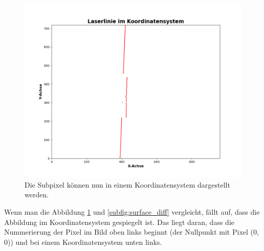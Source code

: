 	\begin{figure}[h]
		\centering
		\includegraphics[width=0.8\linewidth]{img/hauptteil/bildverarbeitung/pixel_koord.png}
		\caption[Subpixel im Koordinatensystem]{Die Subpixel können nun in einem Koordinatensystem dargestellt werden.}
		\label{fig:pix_koord}
	\end{figure} 

	Wenn man die Abbildung \ref{fig:pix_koord} und \ref{subfig:surface_diff} vergleicht, fällt auf, dass die Abbildung im Koordinatensystem gespiegelt ist. Das liegt daran, dass die Nummerierung der Pixel im Bild oben links beginnt (der Nullpunkt mit Pixel (0, 0)) und bei einem Koordinatensystem unten links. 

	\label{chap:erkennen_der_laserlinie}
